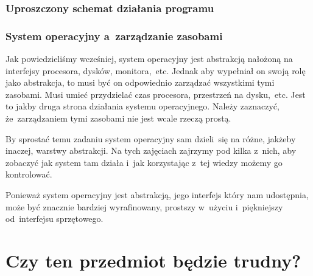 \documentclass[10pt,t]{beamer}
\begin{document}
\begin{frame}
  \frametitle{Uproszczony schemat działania programu}




\end{frame}





\begin{frame}
  \frametitle{System operacyjny a~zarządzanie zasobami}


  Jak powiedzieliśmy wcześniej, system operacyjny jest abstrakcją nałożoną
  na interfejsy procesora, dysków, monitora,~etc. Jednak aby wypełniał
  on swoją rolę jako abstrakcja, to musi być on odpowiednio
  \alert{zarządzać} wszystkimi tymi zasobami. Musi umieć przydzielać czas
  procesora, przestrzeń na dysku,~etc. Jest to jakby druga strona działania
  systemu operacyjnego. Należy zaznaczyć, że~zarządzaniem tymi zasobami nie
  jest wcale rzeczą prostą.

  By sprostać temu zadaniu system operacyjny sam dzieli~się na różne,
  jakżeby inaczej, warstwy abstrakcji. Na tych zajęciach zajrzymy pod kilka
  z~nich, aby zobaczyć jak system tam działa i~jak korzystając z~tej wiedzy
  możemy go kontrolować.

  Ponieważ system operacyjny jest abstrakcją, jego interfejs który
  nam udostępnia, może być znacznie bardziej wyrafinowany, prostszy
  w~użyciu i~piękniejszy od~interfejsu sprzętowego.

\end{frame}










\section{Czy ten przedmiot będzie trudny?}
\end{document}
